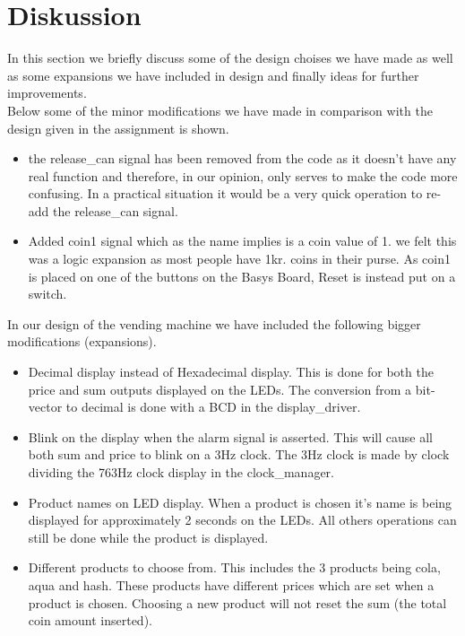\newpage
\chapter{Diskussion}
In this section we briefly discuss some of the design choises we have made as well as some expansions we have included in design and finally ideas for further improvements.\\

Below some of the minor modifications we have made in comparison with the design given in the assignment is shown.

\begin{itemize}
\item the release\_can signal has been removed from the code as it doesn't have any real function and therefore, in our opinion, only serves to make the code more confusing. In a practical situation it would be a very quick operation to re-add the release\_can signal.

\item Added coin1 signal which as the name implies is a coin value of 1. we felt this was a logic expansion as most people have 1kr. coins in their purse. As coin1 is placed on one of the buttons on the Basys Board, Reset is instead put on a switch.
\end{itemize}

In our design of the vending machine we have included the following bigger modifications (expansions).

\begin{itemize}
\item Decimal display instead of Hexadecimal display. This is done for both the price and sum outputs displayed on the LEDs. The conversion from a bit-vector to decimal is done with a BCD in the display\_driver.

\item Blink on the display when the alarm signal is asserted. This will cause all both sum and price to blink on a 3Hz clock. The 3Hz clock is made by clock dividing the 763Hz clock display in the clock\_manager.

\item Product names on LED display. When a product is chosen it's name is being displayed for approximately 2 seconds on the LEDs. All others operations can still be done while the product is displayed.

\item Different products to choose from. This includes the 3 products being cola, aqua and hash. These products have different prices which are set when a product is chosen. Choosing a new product will not reset the sum (the total coin amount inserted).
\end{itemize}


